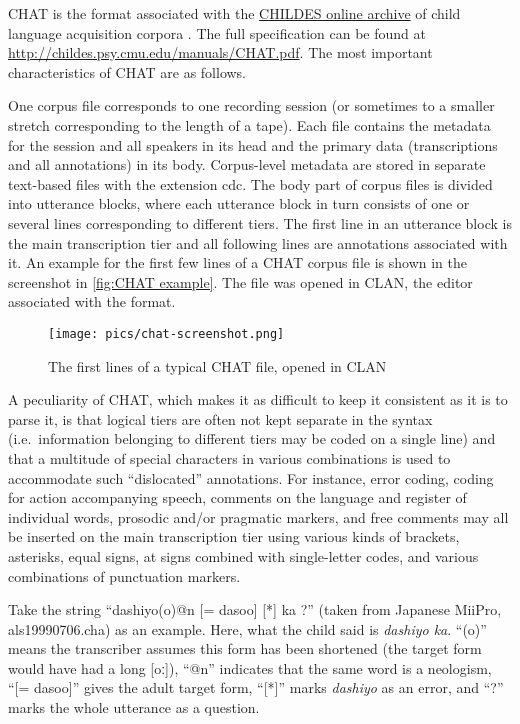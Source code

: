 \documentclass[a4paper, 11pt]{book}
\begin{document}
CHAT is the format associated with the \href{http://childes.psy.cmu.edu/}{CHILDES online archive} of child language acquisition corpora \citep{MacWhinney2000a}. The full specification can be found at \url{http://childes.psy.cmu.edu/manuals/CHAT.pdf}. 
The most important characteristics of CHAT are as follows. 

One corpus file corresponds to one recording session (or sometimes to a smaller stretch corresponding to the length of a tape). Each file contains the metadata for the session and all speakers in its head and the primary data (transcriptions and all annotations) in its body. Corpus-level metadata are stored in separate text-based files with the extension cdc. The body part of corpus files is divided into utterance blocks, where each utterance block in turn consists of one or several lines corresponding to different tiers. The first line in an utterance block is the main transcription tier and all following lines are annotations associated with it. An example for the first few lines of a CHAT corpus file is shown in the screenshot in \autoref{fig:CHAT example}. The file was opened in CLAN, the editor associated with the format. 

\begin{figure}[ht!]
	\centering
	\texttt{[image: pics/chat-screenshot.png]}
	\caption{The first lines of a typical CHAT file, opened in CLAN}
	\label{fig:CHAT example}
\end{figure}

A peculiarity of CHAT, which makes it as difficult to keep it consistent as it is to parse it, is that logical tiers are often not kept separate in the syntax (i.e.\ information belonging to different tiers may be coded on a single line) and that a multitude of special characters in various combinations is used to accommodate such “dislocated” annotations. For instance, error coding, coding for action accompanying speech, comments on the language and register of individual words, prosodic and/or pragmatic markers, and free comments may all be inserted on the main transcription tier using various kinds of brackets, asterisks, equal signs, at signs combined with single-letter codes, and various combinations of punctuation markers. 

Take the string “dashiyo(o)@n [= dasoo] [*] ka ?” (taken from Japanese MiiPro, als19990706.cha) as an example. Here, what the child said is \emph{dashiyo ka}. “(o)” means the transcriber assumes this form has been shortened (the target form would have had a long [oː]), “@n” indicates that the same word is a neologism, “[= dasoo]” gives the adult target form, “[*]” marks \emph{dashiyo} as an error, and “?” marks the whole utterance as a question. 
\end{document}
